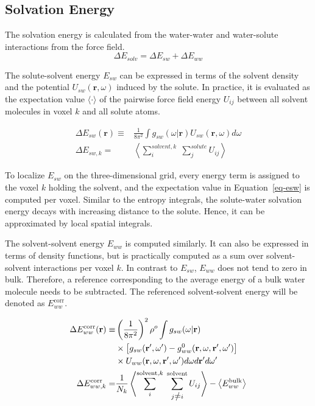 \documentclass[9pt,tutorial]{livecoms}
\renewcommand{\neq}{\setbox0\hbox{=}\rlap{\hbox to \wd0{\hss /\hss}}\box0}
\begin{document}
\subsection{Solvation Energy}
The solvation energy is calculated from the water-water and water-solute interactions from the force field.
\begin{equation}
	\Delta E_\textit{solv} = \Delta E_\textit{sw} + \Delta E_\textit{ww}
\end{equation}

The solute-solvent energy $E_{sw}$ can be expressed in terms of the solvent density and the potential $U_{sw}(\textbf{r},\omega)$ induced by the solute.
In practice, it is evaluated as the expectation value $\langle\cdot\rangle$ of the pairwise force field energy $U_{ij}$ between all solvent molecules in voxel $k$ and all solute atoms.

\begin{equation}
	\begin{aligned}
		\label{eq-esw}
		\Delta E_{sw}(\textbf{r}) \equiv& \frac{1}{8\pi^2} \int g_\textit{sw}\left(\omega|\textbf{r}\right) U_\textit{sw}\left(\textbf{r}, \omega\right) d\omega \\
		\Delta E_{sw,k}=& \left\langle \sum_i^{\textit{solvent},k} \; \sum_j^\textit{solute} U_{ij}\right\rangle
	\end{aligned}
\end{equation}

To localize $E_{sw}$ on the three-dimensional grid, every energy term is assigned to the voxel $k$ holding the solvent, and the expectation value in Equation~\ref{eq-esw} is computed per voxel.
Similar to the entropy integrals, the solute-water solvation energy decays with increasing distance to the solute.
Hence, it can be approximated by local spatial integrals. 

The solvent-solvent energy $E_{ww}$ is computed similarly.
It can also be expressed in terms of density functions, but is practically computed as a sum over solvent-solvent interactions per voxel $k$.
In contrast to $E_{sw}$, $E_{ww}$ does not tend to zero in bulk.
Therefore, a reference corresponding to the average energy of a bulk water molecule needs to be subtracted.
The referenced solvent-solvent energy will be denoted as $E_{ww}^\text{corr}$.

\begin{equation}
	\begin{aligned}
		\Delta E_{ww}^\text{corr}(\textbf{r}) \equiv & \left(\frac{1}{8\pi^2} \right)^2 \rho^o \int g_{sw}(\omega|\textbf{r}) \\
			& \times \left[g_{sw}(\textbf{r}^\prime , \omega^\prime) - g^0_{ww} (\textbf{r}, \omega, \textbf{r}^\prime, \omega^\prime )\right] \\
			& \times U_{ww}(\textbf{r}, \omega, \textbf{r}^\prime, \omega^\prime)d\omega d\textbf{r}^\prime d\omega^\prime \\
		\Delta E_{ww,k}^\text{corr} =& \frac{1}{N_k} \left\langle \sum_i^{\text{solvent},k} \; \sum_{j \neq i}^\text{solvent} U_{ij}\right\rangle - \left\langle E_{ww}^\text{bulk}\right\rangle
	\end{aligned}
\end{equation}
\end{document}
